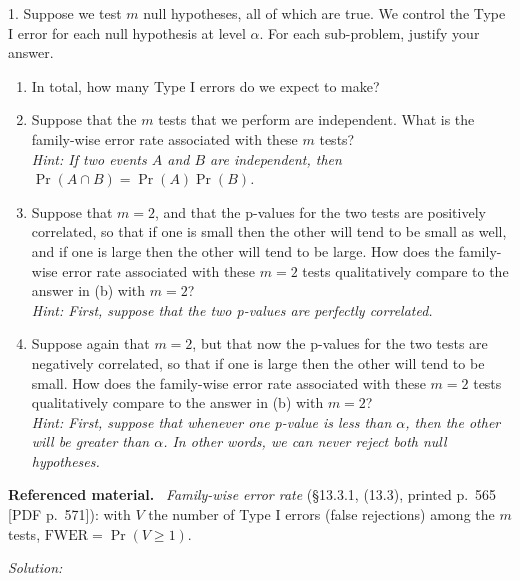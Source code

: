 \documentclass[11pt,a4paper]{article}
\newif\ifsolucoes
\newcommand{\espacoresol}{4.5cm}   %
\numberwithin{equation}{questao}   %
\newenvironment{refmat}{\par\smallskip\noindent\small\textbf{Referenced material.}\ }{\par\smallskip}
\newcommand{\resolespaco}{\ifsolucoes\else\par\textit{Solution:}\vspace{\espacoresol}\par\fi}
\begin{document}
1. Suppose we test $m$ null hypotheses, all of which are true. We control the Type I error for each
null hypothesis at level $\alpha$. For each sub-problem, justify your answer.
\begin{enumerate}[label=(\alph*),leftmargin=2.4em]
\item In total, how many Type I errors do we expect to make?
\item Suppose that the $m$ tests that we perform are independent. What is the family-wise error rate
associated with these $m$ tests?\\
\textit{Hint: If two events $A$ and $B$ are independent, then $\Pr(A\cap B)=\Pr(A)\Pr(B)$.}
\item Suppose that $m=2$, and that the p-values for the two tests are positively correlated, so that
if one is small then the other will tend to be small as well, and if one is large then the other will
tend to be large. How does the family-wise error rate associated with these $m=2$ tests qualitatively
compare to the answer in (b) with $m=2$?\\
\textit{Hint: First, suppose that the two p-values are perfectly correlated.}
\item Suppose again that $m=2$, but that now the p-values for the two tests are negatively
correlated, so that if one is large then the other will tend to be small. How does the family-wise
error rate associated with these $m=2$ tests qualitatively compare to the answer in (b) with $m=2$?\\
\textit{Hint: First, suppose that whenever one p-value is less than $\alpha$, then the other will be
greater than $\alpha$. In other words, we can never reject both null hypotheses.}
\end{enumerate}
\begin{refmat}
\emph{Family-wise error rate} (§13.3.1, (13.3), printed p.~565 [PDF p.~571]): with $V$ the number
of Type I errors (false rejections) among the $m$ tests, $\mathrm{FWER}=\Pr(V\ge1)$.
\end{refmat}
\resolespaco
\end{document}
